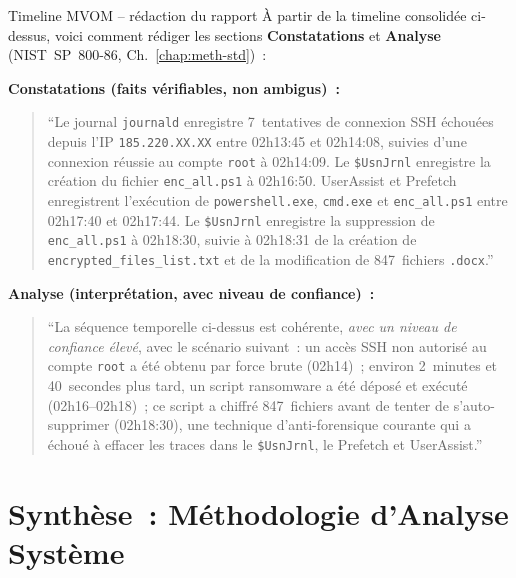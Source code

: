\begin{boxscenario}{Timeline MVOM -- rédaction du rapport}
À partir de la timeline consolidée ci-dessus, voici comment rédiger
les sections \textbf{Constatations} et \textbf{Analyse} (NIST~SP~800-86,
Ch.~\ref{chap:meth-std})~:

\textbf{Constatations (faits vérifiables, non ambigus)~:}
\begin{quote}
``Le journal \texttt{journald} enregistre 7~tentatives de connexion
SSH échouées depuis l'IP \texttt{185.220.XX.XX} entre 02h13:45 et
02h14:08, suivies d'une connexion réussie au compte \texttt{root}
à 02h14:09. Le \texttt{\$UsnJrnl} enregistre la création du fichier
\texttt{enc\_all.ps1} à 02h16:50. UserAssist et Prefetch enregistrent
l'exécution de \texttt{powershell.exe}, \texttt{cmd.exe} et
\texttt{enc\_all.ps1} entre 02h17:40 et 02h17:44. Le \texttt{\$UsnJrnl}
enregistre la suppression de \texttt{enc\_all.ps1} à 02h18:30, suivie
à 02h18:31 de la création de \texttt{encrypted\_files\_list.txt} et
de la modification de 847~fichiers \texttt{.docx}.''
\end{quote}

\textbf{Analyse (interprétation, avec niveau de confiance)~:}
\begin{quote}
``La séquence temporelle ci-dessus est cohérente, \emph{avec un niveau
de confiance élevé}, avec le scénario suivant~: un accès SSH non
autorisé au compte \texttt{root} a été obtenu par force brute
(02h14)~; environ 2~minutes et 40~secondes plus tard, un script
ransomware a été déposé et exécuté (02h16--02h18)~; ce script a
chiffré 847~fichiers avant de tenter de s'auto-supprimer
(02h18:30), une technique d'anti-forensique courante qui a
échoué à effacer les traces dans le \texttt{\$UsnJrnl}, le
Prefetch et UserAssist.''
\end{quote}
\end{boxscenario}

\section{Synthèse~: Méthodologie d'Analyse Système}
\label{sec:synthese-for-sys}

